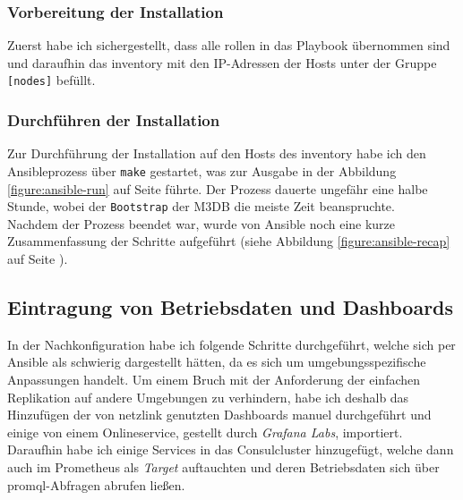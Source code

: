 \documentclass[11pt,a4paper]{article}
\begin{document}
\subsubsection{Vorbereitung der Installation}
Zuerst habe ich sichergestellt, dass alle \gls{rollen} in das Playbook
übernommen sind und daraufhin das \gls{inventory} mit den IP-Adressen der
Hosts unter der Gruppe \verb|[nodes]| befüllt.
\subsubsection{Durchführen der Installation}
Zur Durchführung der Installation auf den Hosts des \gls{inventory}
habe ich den Ansibleprozess über \verb|make| gestartet, was zur Ausgabe
in der Abbildung \ref{figure:ansible-run} auf Seite \pageref{figure:ansible-run} führte.
Der Prozess dauerte ungefähr eine halbe Stunde, wobei der \verb|Bootstrap|
der M3DB die meiste Zeit beanspruchte. \\
Nachdem der Prozess beendet war, wurde von Ansible noch eine kurze Zusammenfassung
der Schritte aufgeführt (siehe Abbildung \ref{figure:ansible-recap} auf Seite \pageref{figure:ansible-recap}).
\subsection{Eintragung von Betriebsdaten und Dashboards}
In der Nachkonfiguration habe ich folgende Schritte durchgeführt,
welche sich per Ansible als schwierig dargestellt hätten,
da es sich um umgebungsspezifische Anpassungen handelt. Um einem Bruch mit
der Anforderung der einfachen Replikation auf andere Umgebungen zu verhindern, habe
ich deshalb das Hinzufügen der von \gls{netzlink} genutzten Dashboards manuel
durchgeführt und einige von einem Onlineservice, gestellt durch \emph{Grafana Labs},
importiert. Daraufhin habe ich einige Services in das Consulcluster hinzugefügt,
welche dann auch im Prometheus als \emph{Target} auftauchten und deren Betriebsdaten
sich über \gls{promql}-Abfragen abrufen ließen.
\\\noindent{\color[HTML]{FF665A} \rule{\linewidth}{1mm}}
\end{document}
